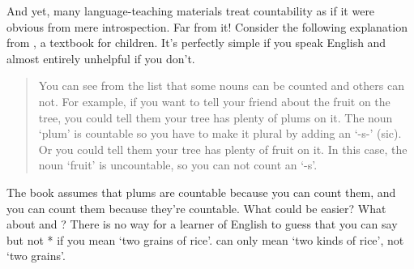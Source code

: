 And yet, many language-teaching materials treat countability as if it were obvious from mere introspection. Far from it! Consider the following explanation from \citet{allen2008}, a textbook for children. It's perfectly simple if you speak English and almost entirely unhelpful if you don't.

\begin{quote}
    You can see from the list that some nouns can be counted and others can not. For example, if you want to tell your friend about the fruit on the tree, you could tell them your tree has plenty of plums on it. The noun `plum' is countable so you have to make it plural by adding an `-s-' (sic). Or you could tell them your tree has plenty of fruit on it. In this case, the noun `fruit' is uncountable, so you can not count an `-s'. \citet[1]{allen2008}
\end{quote}

The book assumes that plums are countable because you can count them, and you can count them because they're countable. What could be easier? What about  and ? There is no way for a learner of English to guess that you can say  but not * if you mean `two grains of rice'.  can only mean `two kinds of rice', not `two grains'.

